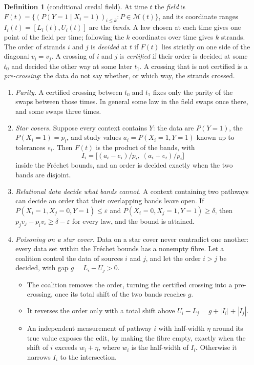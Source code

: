 \documentclass[11pt]{article}
\theoremstyle{definition}\newtheorem{definition}[theorem]{Definition}\newtheorem{remark}[theorem]{Remark}\newtheorem{example}[theorem]{Example}\newtheorem{problem}[theorem]{Open problem}\crefname{problem}{Problem}{Problems}
\begin{document}
\begin{definition}[conditional credal field]\label{def:credalfield}
At time $t$ the \emph{field} is $F(t)=\{(P(Y=1\mid X_i=1))_{i\le k}:P\in\mathcal M(t)\}$, and its coordinate ranges $I_i(t)=[L_i(t),U_i(t)]$ are the \emph{bands}. A law chosen at each time gives one point of the field per time; following the $k$ coordinates over time gives $k$ strands. The order of strands $i$ and $j$ is \emph{decided} at $t$ if $F(t)$ lies strictly on one side of the diagonal $v_i=v_j$. A crossing of $i$ and $j$ is \emph{certified} if their order is decided at some $t_0$ and decided the other way at some later $t_1$. A crossing that is not certified is a \emph{pre-crossing}: the data do not say whether, or which way, the strands crossed.
\end{definition}

\begin{proposition}\label{prop:credalfield}
\begin{enumerate}
\item[(i)] \emph{Parity.} A certified crossing between $t_0$ and $t_1$ fixes only the parity of the swaps between those times. In general some law in the field swaps once there, and some swaps three times.
\item[(ii)] \emph{Star covers.} Suppose every context contains $Y$: the data are $P(Y=1)$, the $P(X_i=1)=p_i$, and study values $a_i=P(X_i=1,Y=1)$ known up to tolerances $e_i$. Then $F(t)$ is the product of the bands, with
\[
I_i=\big[(a_i-e_i)/p_i,\ (a_i+e_i)/p_i\big]
\]
inside the Fr\'echet bounds, and an order is decided exactly when the two bands are disjoint.
\item[(iii)] \emph{Relational data decide what bands cannot.} A context containing two pathways can decide an order that their overlapping bands leave open. If $P(X_i=1,X_j=0,Y=1)\le\varepsilon$ and $P(X_i=0,X_j=1,Y=1)\ge\delta$, then $p_jv_j-p_iv_i\ge\delta-\varepsilon$ for every law, and the bound is attained.
\item[(iv)] \emph{Poisoning on a star cover.} Data on a star cover never contradict one another: every data set within the Fr\'echet bounds has a nonempty fibre. Let a coalition control the data of sources $i$ and $j$, and let the order $i>j$ be decided, with gap $g=L_i-U_j>0$.
\begin{itemize}
\item The coalition removes the order, turning the certified crossing into a pre-crossing, once its total shift of the two bands reaches $g$.
\item It reverses the order only with a total shift above $U_i-L_j=g+|I_i|+|I_j|$.
\item An independent measurement of pathway $i$ with half-width $\eta$ around its true value exposes the edit, by making the fibre empty, exactly when the shift of $i$ exceeds $w_i+\eta$, where $w_i$ is the half-width of $I_i$. Otherwise it narrows $I_i$ to the intersection.
\end{itemize}
\end{enumerate}
\end{proposition}
\end{document}
